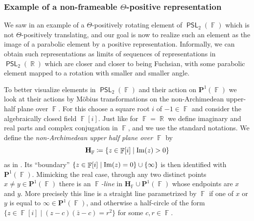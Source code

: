 \documentclass{amsart}
\theoremstyle{plain}
\theoremstyle{definition}
\DeclareMathOperator{\PSL}{\mathsf{PSL}}
\DeclareMathOperator{\Fb}{{\mathbb{F}}}
\DeclareMathOperator{\Rb}{{\mathbb{R}}}
\newcommand{\1}{\mathbf{1}}
\begin{document}
\subsubsection{Example of a non-frameable $\Theta$-positive representation}
\label{subsection: ExNonFramablePosRepr}


We saw in  an example of a $\Theta$-positively rotating element of $\PSL_2(\Fb)$ which is not $\Theta$-positively translating, and our goal is now to realize such an element as the image of a parabolic element by a positive representation. Informally, we can obtain such representations as limits of sequences of representations in $\PSL_2(\Rb)$ which are closer and closer to being Fuchsian, with some parabolic element mapped to a rotation with smaller and smaller angle.


To better visualize elements in $\PSL_2(\Fb)$ and their action on $\mathbf{P}^1(\Fb)$ we look at their actions by M\"obius transformations on the non-Archimedean upper-half plane over $\Fb$.
For this choose a square root $i$ of $-1 \in \Fb$ and consider the algebraically closed field $\Fb[i]$.
Just like for $\Fb=\Rb$ we define imaginary and real parts and complex conjugation in $\Fb$, and we use the standard notations.
We define the \emph{non-Archimedean upper half plane over $\Fb$} by
\[\mathbf{H}_{\Fb} \coloneqq \{z \in \Fb[i] \mid \textnormal{Im}(z)>0\}\]
as in \cite{Brumfiel_TreeNonArchimedeanHyperbolicPlane}.
Its ``boundary'' $\{z \in \Fb[i] \mid \textnormal{Im}(z)=0\} \cup \{ \infty \}$ is then identified with $\mathbf{P}^1(\Fb)$.
Mimicking the real case, through any two distinct points $x \neq y \in \mathbf{P}^1(\Fb)$ there is an \emph{$\Fb$-line} in $\mathbf{H}_{\Fb} \cup \mathbf{P}^1(\Fb)$ whose endpoints are $x$ and $y$.
More precisely this line is a straight line parametrized by $\Fb$ if one of $x$ or $y$ is equal to $\infty \in \mathbf{P}^1(\Fb)$, and otherwise a half-circle of the form $\{z \in \Fb[i] \mid (z-c)(\bar{z} -c) = r^2\}$ for some $c,r \in \Fb$.
\end{document}
